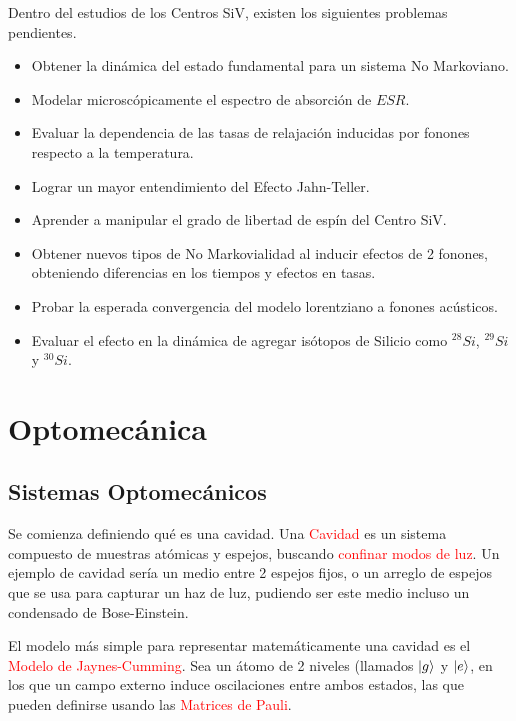 \documentclass{book}
\begin{document}
Dentro del estudios de los Centros SiV, existen los siguientes problemas pendientes.

\begin{itemize}
    \item Obtener la dinámica del estado fundamental para un sistema No Markoviano.
    \item Modelar microscópicamente el espectro de absorción de $ESR$.
    \item Evaluar la dependencia de las tasas de relajación inducidas por fonones respecto a la temperatura. 
    \item Lograr un mayor entendimiento del Efecto Jahn-Teller. 
    \item Aprender a manipular el grado de libertad de espín del Centro SiV.
    \item Obtener nuevos tipos de No Markovialidad al inducir efectos de 2 fonones, obteniendo diferencias en los tiempos y efectos en tasas.
    \item Probar la esperada convergencia del modelo lorentziano a fonones acústicos.
    \item Evaluar el efecto en la dinámica de agregar isótopos de Silicio como ${}^{28}Si$, ${}^{29}Si$ y ${}^{30}Si$.
\end{itemize}

\chapter{Optomecánica}
\section{Sistemas Optomecánicos}
Se comienza definiendo qué es una cavidad. Una \textcolor{red}{Cavidad} es un sistema compuesto de muestras atómicas y espejos, buscando \textcolor{red}{confinar modos de luz}. Un ejemplo de cavidad sería un medio entre 2 espejos fijos, o un arreglo de espejos que se usa para capturar un haz de luz, pudiendo ser este medio incluso un condensado de Bose-Einstein.

El modelo más simple para representar matemáticamente una cavidad es el \textcolor{red}{Modelo de Jaynes-Cumming}. Sea un átomo de 2 niveles (llamados $\ket{g}$ y $\ket{e}$, en los que un campo externo induce oscilaciones entre ambos estados, las que pueden definirse usando las \textcolor{red}{Matrices de Pauli}.
\end{document}
